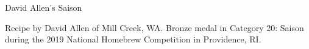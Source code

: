 \begin{recipe}{David Allen's Saison}

\begin{aboutblock}
Recipe by David Allen of Mill Creek, WA. Bronze medal in Category 20: Saison
during the 2019 National Homebrew Competition in Providence, RI. \sourceaha
\end{aboutblock}


\begin{methodandtiming}
 
\begin{mashsteps}
\end{mashsteps}

\begin{fermentationsteps}
\end{fermentationsteps}

\end{methodandtiming}

\recipebreak

\begin{ingredientsblock}

\begin{malts}
\end{malts}

\begin{hops}
\end{hops}

\begin{yeastsx}
\end{yeastsx}

\end{ingredientsblock}

\end{recipe}

